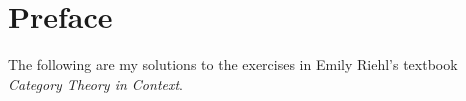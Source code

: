\chapter{Preface}

The following are my solutions to the exercises in Emily Riehl’s textbook \emph{Category Theory in Context}.
